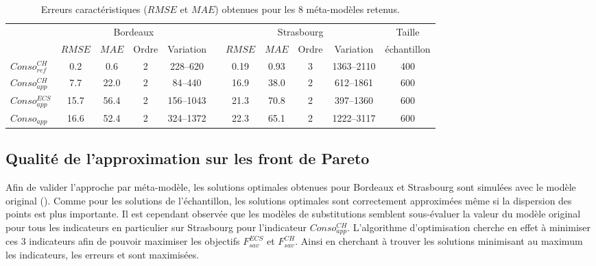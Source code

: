 \begin{table}
\centering
\caption{Erreurs caractéristiques ($RMSE$ et $MAE$) obtenues pour les \num{8} méta-modèles retenus.}
\label{tab:meta_result_bilan}
\begin{tabular}{l c c c c c c c c c c}
    \toprule
                    & \multicolumn{4}{c}{Bordeaux} & & \multicolumn{4}{c}{Strasbourg} &
                      Taille \\
                    \cmidrule(r){2-5}
                    \cmidrule(r){7-10}
                    & $RMSE$ & $MAE$  & Ordre & Variation  &       & $RMSE$ & $MAE$ & Ordre & Variation & échantillon \\
    \midrule
    $Conso_{ref}^{CH}$  & \num{0.2}  & \num{0.6}  & \num{2} & \numrange{228}{620}&   & \num{0.19}   & \num{0.93}  & \num{3}     & \numrange{1363}{2110}      & \num{400}  \\
    \addlinespace[\defaultaddspace]
    $Conso_{app}^{CH}$  & \num{7.7}  & \num{22.0} & \num{2} & \numrange{84}{440} &   & \num{16.9}   & \num{38.0}  & \num{2}     & \numrange{612}{1861}       & \num{600} \\
    \addlinespace[\defaultaddspace]
    $Conso_{app}^{ECS}$ & \num{15.7} & \num{56.4} & \num{2} & \numrange{156}{1043}&  & \num{21.3}   & \num{70.8}  & \num{2}     & \numrange{397}{1360}       & \num{600} \\
    \addlinespace[\defaultaddspace]
    $Conso_{app}$       & \num{16.6} & \num{52.4} & \num{2} & \numrange{324}{1372}&  & \num{22.3}   & \num{65.1}  & \num{2}     & \numrange{1222}{3117}       & \num{600} \\
    \bottomrule
\end{tabular}
\end{table}



\subsection{Qualité de l’approximation sur les front de Pareto} %
\label{sub:qualite_de_l_approximation_sur_les_front_de_pareto}
Afin de valider l’approche par méta-modèle, les solutions optimales obtenues pour Bordeaux
et Strasbourg sont simulées avec le modèle original ().
Comme pour les solutions de l’échantillon, les solutions optimales sont correctement
approximées même si la dispersion des points est plus importante. Il est cependant
observée que les modèles de substitutions semblent sous-évaluer la valeur du modèle
original pour tous les indicateurs en particulier sur Strasbourg pour l’indicateur
$Conso_{app}^{CH}$. L’algorithme d’optimisation cherche en effet à minimiser ces $3$
indicateurs afin de pouvoir maximiser les objectifs $F_{sav}^{ECS}$ et $F_{sav}^{CH}$.
Ainsi en cherchant à trouver les solutions minimisant au maximum les indicateurs, les erreurs
 et  sont maximisées.

